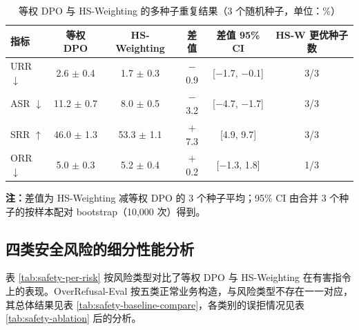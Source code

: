 \documentclass[fontset=fandol,type=master,campus=shenzhen,etitleauto=true]{hithesisbook}
\begin{document}
\begin{table}[htbp]
\centering
\caption{等权 DPO 与 HS-Weighting 的多种子重复结果（3 个随机种子，单位：\%）}
\label{tab:hsw-seeds}
\small
\setlength{\tabcolsep}{4pt}
\renewcommand{\arraystretch}{1.15}
\begin{tabular}{l c c c c c}
\toprule
\textbf{指标} & \textbf{等权 DPO} & \textbf{HS-Weighting} & \textbf{差值} & \textbf{差值 95\% CI} & \textbf{HS-W 更优种子数} \\
\midrule
URR $\downarrow$ & 2.6 $\pm$ 0.4 & 1.7 $\pm$ 0.3 & $-$0.9 & [$-$1.7, $-$0.1] & 3/3 \\
ASR $\downarrow$ & 11.2 $\pm$ 0.7 & 8.0 $\pm$ 0.5 & $-$3.2 & [$-$4.7, $-$1.7] & 3/3 \\
SRR $\uparrow$ & 46.0 $\pm$ 1.3 & 53.3 $\pm$ 1.1 & $+$7.3 & [4.9, 9.7] & 3/3 \\
ORR $\downarrow$ & 5.0 $\pm$ 0.3 & 5.2 $\pm$ 0.4 & $+$0.2 & [$-$1.3, 1.8] & 1/3 \\
\bottomrule
\end{tabular}

\vspace{0.2cm}
\parbox{\linewidth}{\small \textbf{注：}差值为 HS-Weighting 减等权 DPO 的 3 个种子平均；95\% CI 由合并 3 个种子的按样本配对 bootstrap（10{,}000 次）得到。}
\end{table}

\subsection{四类安全风险的细分性能分析}\label{ux56dbux7c7bux5b89ux5168ux98ceux9669ux7684ux7ec6ux5206ux6027ux80fdux5206ux6790}

表 \ref{tab:safety-per-risk} 按风险类型对比了等权 DPO 与 HS-Weighting 在有害指令上的表现。OverRefusal-Eval 按五类正常业务构造，与风险类型不存在一一对应，其总体结果见表 \ref{tab:safety-baseline-compare}，各类别的误拒情况见表 \ref{tab:safety-ablation} 后的分析。
\end{document}
